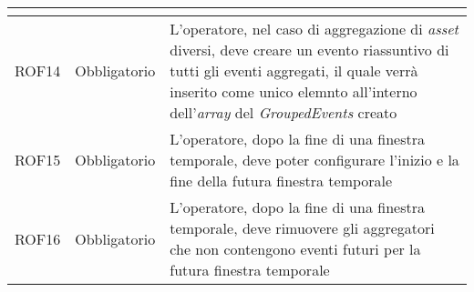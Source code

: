 {\begin{longtable}{L{3cm} L{3cm} L{7.5cm}}
\begin{itemize}
\end{itemize}\\
\hline
ROF14 & Obbligatorio & L'operatore, nel caso di aggregazione di \textit{asset} diversi, deve creare un evento riassuntivo di tutti gli eventi aggregati, il quale verrà inserito come unico elemnto all'interno dell'\textit{array} del \textit{GroupedEvents} creato\\
ROF15 & Obbligatorio & L'operatore, dopo la fine di una finestra temporale, deve poter configurare l'inizio e la fine della futura finestra temporale\\
\hline
ROF16 & Obbligatorio & L'operatore, dopo la fine di una finestra temporale, deve rimuovere gli aggregatori che non contengono eventi futuri per la futura finestra temporale\\
\hline
\end{longtable}
}


